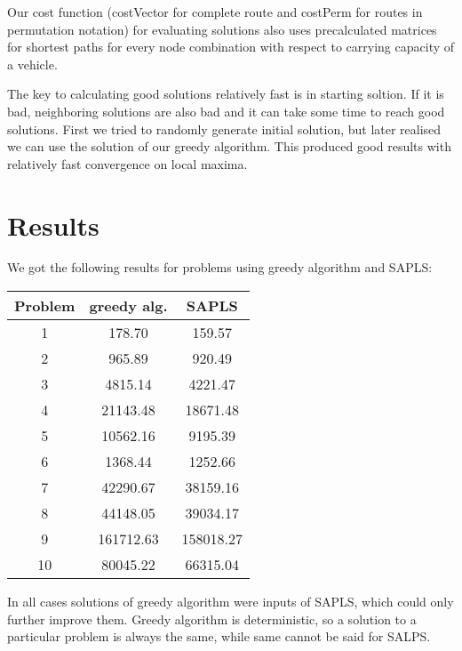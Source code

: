 \documentclass[a4paper, 12pt]{article}
\begin{document}
Our cost function ({\sf costVector} for complete route and {\sf costPerm} for
routes in permutation notation) for evaluating solutions also uses
precalculated matrices for shortest paths for every node combination with
respect to carrying capacity of a vehicle.

The key to calculating good solutions relatively fast is in starting soltion.
If it is bad, neighboring solutions are also bad and it can take some time to
reach good solutions. First we tried to randomly generate initial solution, but
later realised we can use the solution of our greedy algorithm. This produced
good results with relatively fast convergence on local maxima.

\section{Results}

We got the following results for problems using greedy algorithm and SAPLS:
\begin{center}
\begin{tabular}{ c|cc }
	Problem & greedy alg. & SAPLS \\
	\hline
	1 & 178.70 & 159.57 \\
	2 & 965.89 & 920.49 \\
	3 & 4815.14 & 4221.47 \\
	4 & 21143.48 & 18671.48 \\
	5 & 10562.16 & 9195.39 \\
	6 & 1368.44 & 1252.66 \\
	7 & 42290.67 & 38159.16 \\
	8 & 44148.05 & 39034.17 \\
	9 & 161712.63 & 158018.27 \\
	10 & 80045.22 & 66315.04 \\
\end{tabular}
\end{center}

In all cases solutions of greedy algorithm were inputs of SAPLS, which could
only further improve them. Greedy algorithm is deterministic, so a solution to
a particular problem is always the same, while same cannot be said for SALPS.
\end{document}
